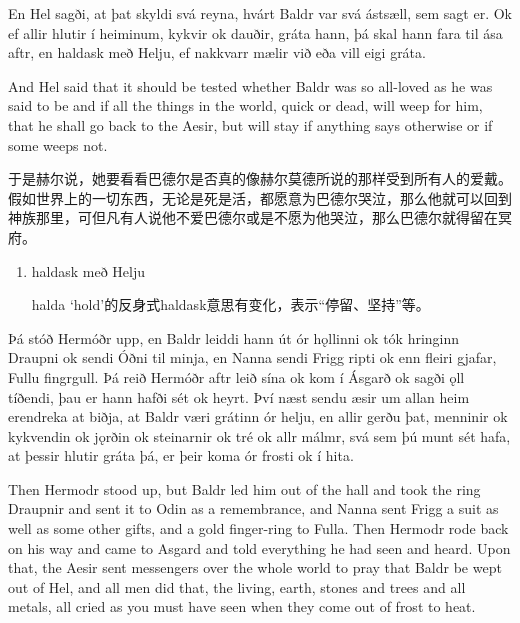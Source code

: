 \begin{paracol}{2}
    En Hel sagði, at þat skyldi svá reyna, hvárt Baldr var svá ástsæll, sem sagt er. Ok ef allir hlutir í heiminum, kykvir ok dauðir, gráta hann, þá skal hann fara til ása aftr, en haldask með Helju, ef nakkvarr mælir við eða vill eigi gráta.

    \switchcolumn

    And Hel said that it should be tested whether Baldr was so all-loved as he was said to be and if all the things in the world, quick or dead, will weep for him, that he shall go back to the Aesir, but will stay if anything says otherwise or if some weeps not.
\end{paracol}
\begin{translation*}{}
    于是赫尔说，她要看看巴德尔是否真的像赫尔莫德所说的那样受到所有人的爱戴。假如世界上的一切东西，无论是死是活，都愿意为巴德尔哭泣，那么他就可以回到神族那里，可但凡有人说他不爱巴德尔或是不愿为他哭泣，那么巴德尔就得留在冥府。
\end{translation*}
\begin{grammar*}{}
    \begin{enumerate}[leftmargin=*]
        \item haldask með Helju

              halda `hold'的反身式haldask意思有变化，表示“停留、坚持”等。
    \end{enumerate}
\end{grammar*}
\begin{paracol}{2}
    Þá stóð Hermóðr upp, en Baldr leiddi hann út ór hǫllinni ok tók hringinn Draupni ok sendi Óðni til minja, en Nanna sendi Frigg ripti ok enn fleiri gjafar, Fullu fingrgull. Þá reið Hermóðr aftr leið sína ok kom í Ásgarð ok sagði ǫll tíðendi, þau er hann hafði sét ok heyrt. Því næst sendu æsir um allan heim erendreka at biðja, at Baldr væri grátinn ór helju, en allir gerðu þat, menninir ok kykvendin ok jǫrðin ok steinarnir ok tré ok allr málmr, svá sem þú munt sét hafa, at þessir hlutir gráta þá, er þeir koma ór frosti ok í hita.

    \switchcolumn

    Then Hermodr stood up, but Baldr led him out of the hall and took the ring Draupnir and sent it to Odin as a remembrance, and Nanna sent Frigg a suit as well as some other gifts, and a gold finger-ring to Fulla. Then Hermodr rode back on his way and came to Asgard and told everything he had seen and heard. Upon that, the Aesir sent messengers over the whole world to pray that Baldr be wept out of Hel, and all men did that, the living, earth, stones and trees and all metals, all cried as you must have seen when they come out of frost to heat.
\end{paracol}
